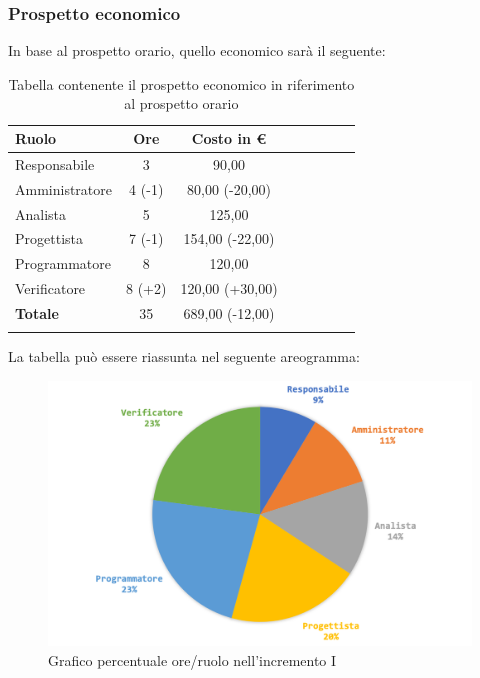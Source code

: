 		\subsubsection{Prospetto economico}
			In base al prospetto orario, quello economico sarà il seguente: 
			
			\begin{longtable}{|l|c|c|c|c|c|c|c|}
				\hline
				\rowcolor{lighter-grayer}
				\textbf{Ruolo} & \textbf{Ore} & \textbf{Costo in €} \\
				\hline
				\endfirsthead
				\hline
			Responsabile 	    & 3 & 90,00\\
			\hline 
			\hline
			Amministratore	  & 4 (-1)& 80,00 (-20,00)\\
			\hline
			\hline
			Analista 				& 5 & 125,00\\
			\hline
			\hline
			Progettista 		  & 7 (-1) & 154,00 (-22,00)\\
			\hline
			\hline
			Programmatore 	 & 8 & 120,00\\
			\hline
			\hline
			Verificatore 		  & 8 (+2) & 120,00 (+30,00)\\
			\hline
			\textbf{Totale} 	& 35 & 689,00 (-12,00)\\
			\hline
				
				\caption{Tabella contenente il prospetto economico in riferimento al prospetto orario}
			\end{longtable}
		\pagebreak
			
			La tabella può essere riassunta nel seguente areogramma:
			\begin{figure}[H]
				\centering
				\includegraphics[width=0.8\linewidth]{images/consuntivo/ConsIncr1-2.png}
				\caption{Grafico percentuale ore/ruolo nell'incremento I}
				\label{fig:consuntivo grafico costi ruolo incremento I}
			\end{figure}


